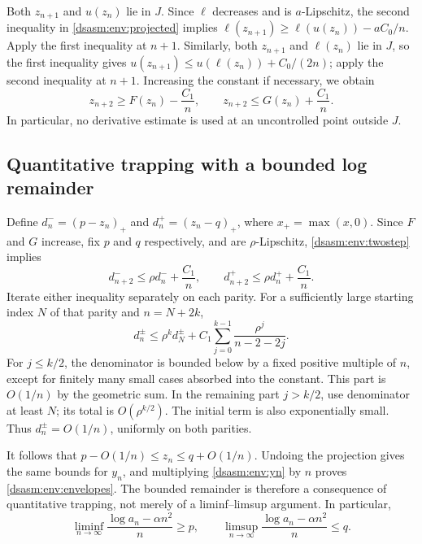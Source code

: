 \documentclass[11pt,letterpaper]{article}
\theoremstyle{remark}\newtheorem{remark}[theorem]{Remark}
\begin{document}
Both $z_{n+1}$ and $u(z_n)$ lie in $J$. Since $\ell$ decreases and is
$a$-Lipschitz, the second inequality in \eqref{dsasm:env:projected} implies
$\ell(z_{n+1})\ge\ell(u(z_n))-aC_0/n$.
Apply the first inequality at $n+1$. Similarly, both $z_{n+1}$ and
$\ell(z_n)$ lie in $J$, so the first inequality gives
$u(z_{n+1})\le u(\ell(z_n))+C_0/(2n)$; apply the second inequality
at $n+1$. Increasing the constant if necessary, we obtain
\begin{equation}\label{dsasm:env:twostep}
 z_{n+2}\ge F(z_n)-\frac{C_1}{n},\qquad
 z_{n+2}\le G(z_n)+\frac{C_1}{n}.
\end{equation}
In particular, no derivative estimate is used at an uncontrolled
point outside $J$.

\subsection{Quantitative trapping with a bounded log remainder}
Define $d_n^-=(p-z_n)_+$ and $d_n^+=(z_n-q)_+$, where
$x_+=\max(x,0)$. Since $F$ and $G$ increase, fix $p$ and $q$
respectively, and are $\rho$-Lipschitz, \eqref{dsasm:env:twostep} implies
\begin{equation}\label{dsasm:env:deficits}
 d_{n+2}^-\le\rho d_n^-+\frac{C_1}{n},\qquad
 d_{n+2}^+\le\rho d_n^++\frac{C_1}{n}.
\end{equation}
Iterate either inequality separately on each parity. For a sufficiently
large starting index $N$ of that parity and $n=N+2k$,
\[
 d_n^\pm\le\rho^k d_N^\pm
   +C_1\sum_{j=0}^{k-1}\frac{\rho^j}{n-2-2j}.
\]
For $j\le k/2$, the denominator is bounded below by a fixed positive
multiple of $n$, except for finitely many small cases absorbed into
the constant. This part is $O(1/n)$ by the geometric sum. In the
remaining part $j>k/2$, use denominator at least $N$; its total is
$O(\rho^{k/2})$. The initial term is also exponentially small.
Thus $d_n^\pm=O(1/n)$, uniformly on both parities.

It follows that $p-O(1/n)\le z_n\le q+O(1/n)$. Undoing the
projection gives the same bounds for $y_n$, and multiplying
\eqref{dsasm:env:yn} by $n$ proves \eqref{dsasm:env:envelopes}. The bounded remainder is
therefore a consequence of quantitative trapping, not merely of a
liminf--limsup argument. In particular,
\[
 \liminf_{n\to\infty}\frac{\log a_n-\alpha n^2}{n}\ge p,
 \qquad
 \limsup_{n\to\infty}\frac{\log a_n-\alpha n^2}{n}\le q.
\]
\end{document}
